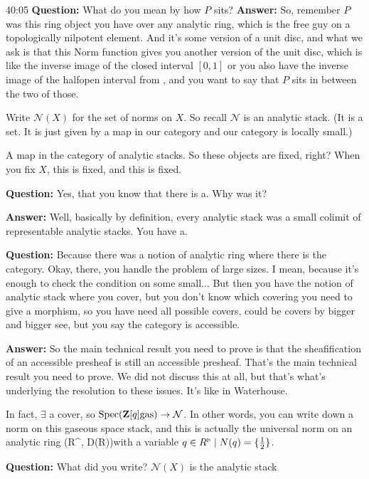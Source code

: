 \begin{example}
\begin{unfinished}{40:05}
\textbf{Question:} What do you mean by how $P$ sits?
\textbf{Answer:} So, remember $P$ was this ring object you have over any analytic ring, which is the free guy on a topologically nilpotent element. And it's some version of a unit disc, and what we ask is that this Norm function gives you another version of the unit disc, which is like the inverse image of the closed interval $[0, 1]$ or you also have the inverse image of the halfopen interval from , and you want to say that $P$ sits in between the two of those.

Write $\mathcal{N}(X)$ for the set of norms on $X$. So recall $\mathcal{N}$ is an analytic stack. (It is a set. It is just given by a map in our category and our category is locally small.)

A map in the category of analytic stacks. So these objects are fixed, right? When you fix $X$, this is fixed, and this is fixed. 

\textbf{Question:} Yes, that you know that there is a. Why was it? 

\textbf{Answer:} Well, basically by definition, every analytic stack was a small colimit of representable analytic stacks. You have a.

\textbf{Question:} Because there was a notion of analytic ring where there is the category. Okay, there, you handle the problem of large sizes. I mean, because it's enough to check the condition on some small... But then you have the notion of analytic stack where you cover, but you don't know which covering you need to give a morphism, so you have need all possible covers, could be covers by bigger and bigger see, but you say the category is accessible. 

\textbf{Answer:}
So the main technical result you need to prove is that the sheafification of an accessible presheaf is still an accessible presheaf. That's the main technical result you need to prove. We did not discuss this at all, but that's what's underlying the resolution to these issues. It's like in Waterhouse.

In fact, $\exists$ a cover, so $\operatorname{Spec}(\mathbf Z[q]\mathrm{gas}) \to \mathcal{N}$. In other words, you can write down a norm on this gaseous space stack, and this is actually the universal norm on an analytic ring (R^\tri, D(R))with a variable $q \in R^\triangleright \mid  N(q) = \{ \frac{1}{2} \}$. 


\textbf{Question:} What did you write? $\mathcal{N}(X)$ is the analytic stack


\end{unfinished}
\end{example}
